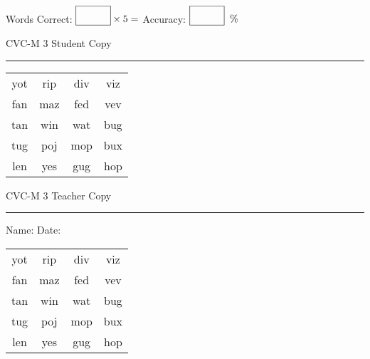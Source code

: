 \documentclass{memoir}
\begin{document}
\small

Words Correct: $\fbox{\phantom{\huge 100}} \times 5 = $ Accuracy: $\fbox{\phantom{\huge 100}}\;\; \%$ 

\vfill

\newpage


\footnotesize \noindent
CVC-M 3 \hfill Student Copy
\smallskip
\hrule

\Large

\setlength{\tabcolsep}{14pt}
\def\arraystretch{2}

{\selectfont


\begin{vplace}[0.5]
\begin{center}
\begin{tabular}{cccc}
yot & rip & div & viz \\
fan & maz & fed & vev \\
tan & win & wat & bug \\
tug & poj & mop & bux \\
len & yes & gug & hop \\
\end{tabular}
\end{center}
\end{vplace}

}

\newpage

\footnotesize \noindent
CVC-M 3 \hfill Teacher Copy
\smallskip
\hrule

\small

\vfill

\noindent
Name: \underline{\hspace{1.75in}} \hfill Date: \underline{\hspace{1in}}

\Large

{\selectfont


\begin{vplace}[0.5]
\begin{center}
\begin{tabular}{cccc}
yot & rip & div & viz \\
fan & maz & fed & vev \\
tan & win & wat & bug \\
tug & poj & mop & bux \\
len & yes & gug & hop \\
\end{tabular}
\end{center}
\end{vplace}



}
\end{document}

